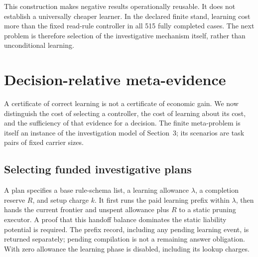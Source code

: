 \documentclass[10pt,letterpaper]{article}
\begin{document}
This construction makes negative results operationally reusable. It does not establish a universally cheaper learner. In the declared finite stand, learning cost more than the fixed read-rule controller in all 515 fully completed cases. The next problem is therefore selection of the investigative mechanism itself, rather than unconditional learning.
\clearpage
\section{Decision-relative meta-evidence}\label{sec:meta-evidence}
A certificate of correct learning is not a certificate of economic gain. We now distinguish the cost of selecting a controller, the cost of learning about its cost, and the sufficiency of that evidence for a decision. The finite meta-problem is itself an instance of the investigation model of Section~3; its scenarios are task pairs of fixed carrier sizes.

\subsection{Selecting funded investigative plans}
A plan specifies a base rule-schema list, a learning allowance $\lambda$, a completion reserve $R$, and setup charge $k$. It first runs the paid learning prefix within $\lambda$, then hands the current frontier and unspent allowance plus $R$ to a static pruning executor. A proof that this handoff balance dominates the static liability potential is required. The prefix record, including any pending learning event, is returned separately; pending compilation is not a remaining answer obligation. With zero allowance the learning phase is disabled, including its lookup charges.
\end{document}
